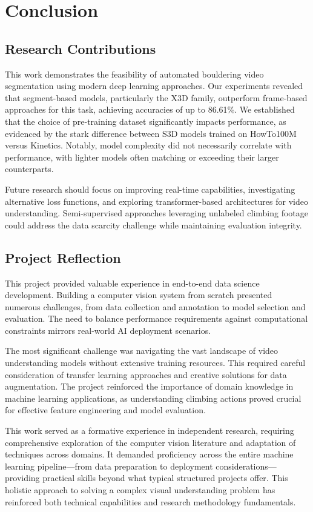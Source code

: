 \section{Conclusion}

\subsection*{Research Contributions}
This work demonstrates the feasibility of automated bouldering video segmentation using modern deep learning approaches. Our experiments revealed that segment-based models, particularly the X3D family, outperform frame-based approaches for this task, achieving accuracies of up to 86.61\%. We established that the choice of pre-training dataset significantly impacts performance, as evidenced by the stark difference between S3D models trained on HowTo100M versus Kinetics. Notably, model complexity did not necessarily correlate with performance, with lighter models often matching or exceeding their larger counterparts.

Future research should focus on improving real-time capabilities, investigating alternative loss functions, and exploring transformer-based architectures for video understanding. Semi-supervised approaches leveraging unlabeled climbing footage could address the data scarcity challenge while maintaining evaluation integrity.

\subsection*{Project Reflection}
This project provided valuable experience in end-to-end data science development. Building a computer vision system from scratch presented numerous challenges, from data collection and annotation to model selection and evaluation. The need to balance performance requirements against computational constraints mirrors real-world AI deployment scenarios.

The most significant challenge was navigating the vast landscape of video understanding models without extensive training resources. This required careful consideration of transfer learning approaches and creative solutions for data augmentation. The project reinforced the importance of domain knowledge in machine learning applications, as understanding climbing actions proved crucial for effective feature engineering and model evaluation.

This work served as a formative experience in independent research, requiring comprehensive exploration of the computer vision literature and adaptation of techniques across domains. It demanded proficiency across the entire machine learning pipeline—from data preparation to deployment considerations—providing practical skills beyond what typical structured projects offer. This holistic approach to solving a complex visual understanding problem has reinforced both technical capabilities and research methodology fundamentals.